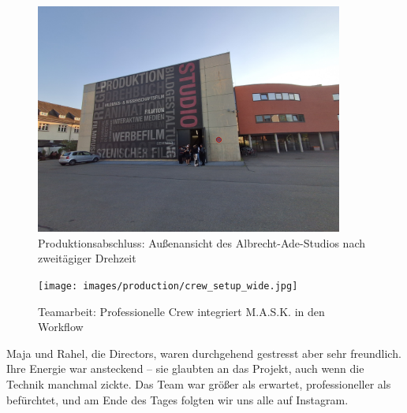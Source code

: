 \begin{figure}[h]
   \centering
   \includegraphics[width=0.9\textwidth]{images/onSetImages/WideShotOfOutsideOfStudioAfter2DayShoot.jpg}
   \caption{Produktionsabschluss: Außenansicht des Albrecht-Ade-Studios nach zweitägiger Drehzeit}
   \label{fig:studio_exterior}
\end{figure}

\begin{figure}[h]
   \centering
   \texttt{[image: images/production/crew\_setup\_wide.jpg]}
   \caption{Teamarbeit: Professionelle Crew integriert M.A.S.K. in den Workflow}
   \label{fig:crew_setup}
\end{figure}

Maja und Rahel, die Directors, waren durchgehend gestresst aber sehr freundlich. Ihre Energie war ansteckend – sie glaubten an das Projekt, auch wenn die Technik manchmal zickte. Das Team war größer als erwartet, professioneller als befürchtet, und am Ende des Tages folgten wir uns alle auf Instagram.

